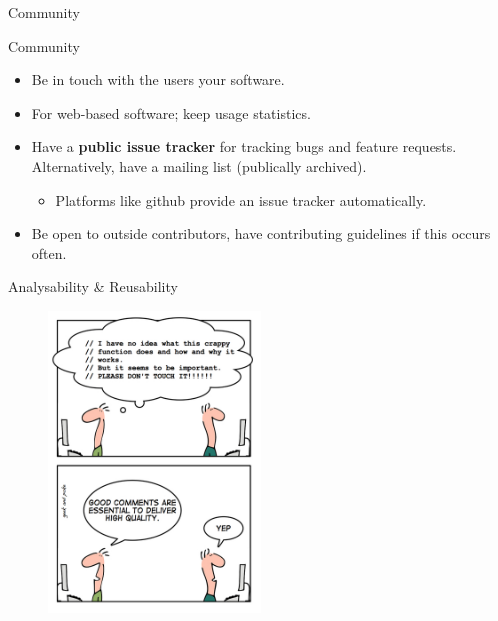 \documentclass[compress]{beamer}
\begin{document}
\begin{frame}{Community}
    \begin{block}{Community}
        \begin{itemize}
            \item Be in touch with the users your software.
            \item For web-based software; keep usage statistics.
            \item Have a \textbf{public issue tracker} for tracking bugs and
                feature requests. Alternatively, have a mailing list
                (publically archived).
            \begin{itemize}
                \item Platforms like github provide an issue tracker automatically.
            \end{itemize}
            \item Be open to outside contributors, have contributing guidelines if this occurs often.
        \end{itemize}
    \end{block}
\end{frame}

\begin{frame}{Analysability \& Reusability}
\begin{figure}
\includegraphics[height=8cm]{img/comments.jpg}
\end{figure}
\end{frame}
\end{document}
